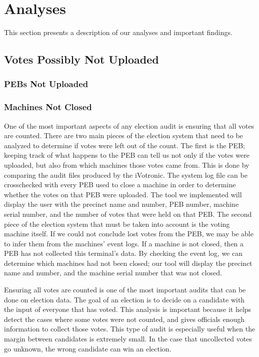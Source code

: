 \section{Analyses}
This section presents a description of our analyses and important findings.
\subsection{Votes Possibly Not Uploaded}
\subsubsection{PEBs Not Uploaded}


\subsubsection{Machines Not Closed}
One of the most important aspects of any election audit is ensuring that all votes are counted.  There are two main pieces of the election system that need to be analyzed to determine if votes were left out of the count.  The first is the PEB; keeping track of what happens to the PEB can tell us not only if the votes were uploaded, but also from which machines those votes came from.  This is done by comparing the audit files produced by the iVotronic.  The system log file can be crosschecked with every PEB used to close a machine in order to determine whether the votes on that PEB were uploaded.  The tool we implemented will display the user with the precinct name and number, PEB number, machine serial number, and the number of votes that were held on that PEB.  The second piece of the election system that must be taken into account is the voting machine itself.  If we could not conclude lost votes from the PEB, we may be able to infer them from the machines' event logs.  If a machine is not closed, then a PEB has not collected this terminal's data.  By checking the event log, we can determine which machines had not been closed; our tool will display the precinct name and number, and the machine serial number that was not closed.  

Ensuring all votes are counted is one of the most important audits that can be done on election data.  The goal of an election is to decide on a candidate with the input of everyone that has voted.  This analysis is important because it helps detect the cases where some votes were not counted, and gives officials enough information to collect those votes.  This type of audit is especially useful when the margin between candidates is extremely small.  In the case that uncollected votes go unknown, the wrong candidate can win an election.  	


